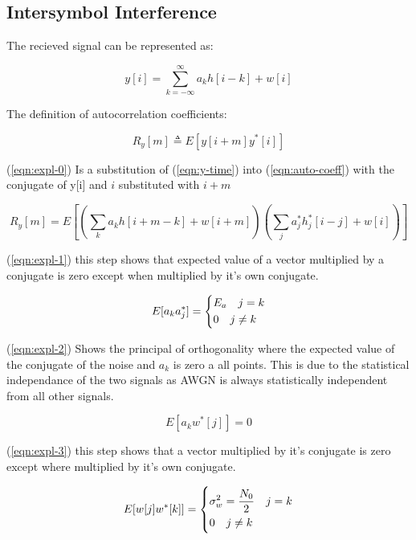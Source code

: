 \subsection{Intersymbol Interference}

The recieved signal can be represented as:

\begin{equation}
    \label{eqn:y-time}
    y[i] = \sum_{k=-\infty}^\infty a_k h[i-k] + w[i]
\end{equation}

The definition of autocorrelation coefficients:

\begin{equation}
    \label{eqn:auto-coeff}
    R_y[m] \triangleq E[y[i+m]y^*[i]]
\end{equation}

(\ref{eqn:expl-0}) Is a substitution of (\ref{eqn:y-time}) into (\ref{eqn:auto-coeff}) with the conjugate of y[i] and
$i$ substituted with $i+m$

\begin{equation}
    \label{eqn:expl-0}
    R_y[m] = E[(\sum_{k}a_kh[i+m-k]+w[i+m])(\sum_j a_j^* h_j^*[i-j]+w[i])]
\end{equation}

(\ref{eqn:expl-1}) this step shows that expected value of a vector multiplied by a conjugate is zero except when multiplied
by it's own conjugate.

\begin{equation}
    \label{eqn:expl-1}
    E[a_k a_j^*] =
    \begin{dcases}
        E_a \quad j=k \\
        0 \quad j \neq k
    \end{dcases}
\end{equation}

(\ref{eqn:expl-2}) Shows the principal of orthogonality where the expected value of the conjugate of the noise and $a_k$ is
zero a all points. This is due to the statistical independance of the two signals as AWGN is always statistically independent from all other
signals.

\begin{equation}
    \label{eqn:expl-2}
    E[a_k w^*[j]] = 0
\end{equation}

(\ref{eqn:expl-3}) this step shows that a vector multiplied by it's conjugate is zero except where multiplied by it's own
conjugate.

\begin{equation}
    \label{eqn:expl-3}
    E[w[j]w^*[k]] =
    \begin{dcases}
        \sigma_w^2 = \frac{N_0}{2} \quad j=k \\
        0 \quad j \neq k
    \end{dcases}
\end{equation}

